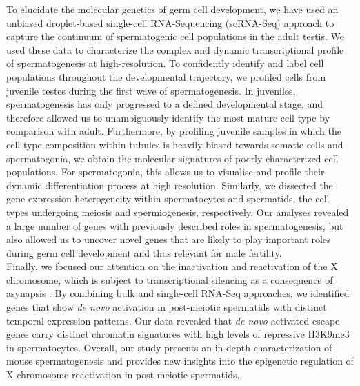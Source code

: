 To elucidate the molecular genetics of germ cell development, we have used an unbiased droplet-based single-cell RNA-Sequencing (scRNA-Seq) approach to capture the continuum of spermatogenic cell populations in the adult testis. We used these data to characterize the complex and dynamic transcriptional profile of spermatogenesis at high-resolution. To confidently identify and label cell populations throughout the developmental trajectory, we profiled cells from juvenile testes during the first wave of spermatogenesis. In juveniles, spermatogenesis has only progressed to a defined developmental stage, and therefore allowed us to unambiguously identify the most mature cell type by comparison with adult. Furthermore, by profiling juvenile samples in which the cell type composition within tubules is heavily biased towards somatic cells and spermatogonia, we obtain the molecular signatures of poorly-characterized cell populations. For spermatogonia, this allows us to visualise and profile their dynamic differentiation process at high resolution. Similarly, we dissected the gene expression heterogeneity within spermatocytes and spermatids, the cell types undergoing meiosis and spermiogenesis, respectively. Our analyses revealed a large number of genes with previously described roles in spermatogenesis, but also allowed us to uncover novel genes that are likely to play important roles during germ cell development and thus relevant for male fertility. \\

Finally, we focused our attention on the inactivation and reactivation of the X chromosome, which is subject to transcriptional silencing as a consequence of asynapsis \citep{Turner2007}. By combining bulk and single-cell RNA-Seq approaches, we identified genes that show \textit{de novo} activation in post-meiotic spermatids with distinct temporal expression patterns. Our data revealed that \textit{de novo} activated escape genes carry distinct chromatin signatures with high levels of repressive H3K9me3 in spermatocytes. Overall, our study presents an in-depth characterization of mouse spermatogenesis and provides new insights into the epigenetic regulation of X chromosome reactivation in post-meiotic spermatids.
